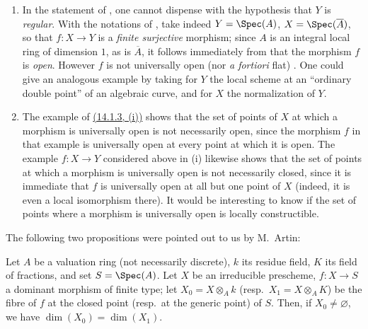 \begin{remarks}[14.3.9]
\label{IV.14.3.9}
\begin{enumerate}[label=(\roman*)]
  \item In the statement of , one cannot dispense with the hypothesis that $Y$ is \emph{regular}.
  With the notations of , take indeed $Y=\Spec(A)$, $X=\Spec(\overline{A})$, so that $f:X\to Y$ is a \emph{finite surjective} morphism; since $A$ is an integral local ring of dimension $1$, as is $\overline{A}$, it follows immediately from  that the morphism $f$ is \emph{open}.
  However $f$ is not universally open (nor \emph{a fortiori} flat) .
  One could give an analogous example by taking for $Y$ the local scheme at an ``ordinary double point'' of an algebraic curve, and for $X$ the normalization of $Y$.

  \item The example of \hyperref[IV.14.1.3]{(14.1.3, (i))} shows that the set of points of $X$ at which a morphism is universally open is not necessarily open, since the morphism $f$ in that example is universally open at every point at which it is open.
  The example $f:X\to Y$ considered above in (i) likewise shows that the set of points at which a morphism is universally open is not necessarily closed, since it is immediate that $f$ is universally open at all but one point of $X$ (indeed, it is even a local isomorphism there).
  It would be interesting to know if the set of points where a morphism is universally open is locally constructible.
\end{enumerate}
\end{remarks}

The following two propositions were pointed out to us by M.\ Artin:

\begin{lemma}[14.3.10]
\label{IV.14.3.10}
Let $A$ be a valuation ring (not necessarily discrete), $k$ its residue field, $K$ its field of fractions, and set $S=\Spec(A)$.
Let $X$ be an irreducible prescheme, $f:X\to S$ a dominant morphism of finite type; let $X_0=X\otimes_A k$ (resp.\ $X_1=X\otimes_A K$) be the fibre of $f$ at the closed point (resp.\ at the generic point) of $S$.
Then, if $X_0\neq\varnothing$, we have $\dim(X_0)=\dim(X_1)$.
\end{lemma}

